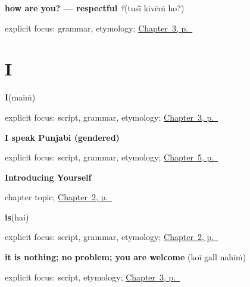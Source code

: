 \noindent\begin{minipage}[t]{\linewidth}
\raggedright
\textbf{how are you? — respectful}\enspace\emph{  ?}\enspace(tusī̃ kivēṁ ho?)\par
\footnotesize explicit focus: grammar, etymology; \hyperref[ch:responding]{Chapter~3, p.~\pageref*{ch:responding}}
\end{minipage}\par\smallskip

\section*{I}

\noindent\begin{minipage}[t]{\linewidth}
\raggedright
\textbf{I}\enspace\emph{}\enspace(maiṁ)\par
\footnotesize explicit focus: script, grammar, etymology; \hyperref[ch:responding]{Chapter~3, p.~\pageref*{ch:responding}}
\end{minipage}\par\smallskip

\noindent\begin{minipage}[t]{\linewidth}
\raggedright
\textbf{I speak Punjabi (gendered)}\enspace\emph{   }\par
\footnotesize explicit focus: script, grammar, etymology; \hyperref[ch:first-verbs]{Chapter~5, p.~\pageref*{ch:first-verbs}}
\end{minipage}\par\smallskip

\noindent\begin{minipage}[t]{\linewidth}
\raggedright
\textbf{Introducing Yourself}\par
\footnotesize chapter topic; \hyperref[ch:introductions]{Chapter~2, p.~\pageref*{ch:introductions}}
\end{minipage}\par\smallskip

\noindent\begin{minipage}[t]{\linewidth}
\raggedright
\textbf{is}\enspace\emph{}\enspace(hai)\par
\footnotesize explicit focus: script, grammar, etymology; \hyperref[ch:introductions]{Chapter~2, p.~\pageref*{ch:introductions}}
\end{minipage}\par\smallskip

\noindent\begin{minipage}[t]{\linewidth}
\raggedright
\textbf{it is nothing; no problem; you are welcome}\enspace\emph{  }\enspace(koī gall nahīṁ)\par
\footnotesize explicit focus: script, etymology; \hyperref[ch:responding]{Chapter~3, p.~\pageref*{ch:responding}}
\end{minipage}\par\smallskip

